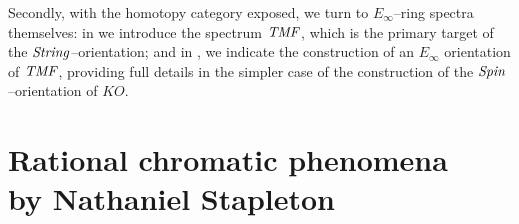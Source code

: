 Secondly, with the homotopy category exposed, we turn to \(E_\infty\)--ring spectra themselves: in  we introduce the spectrum \(\mathit{TMF}\), which is the primary target of the \(\mathit{String}\)--orientation; and in , we indicate the construction of an \(E_\infty\) orientation of \(\mathit{TMF}\), providing full details in the simpler case of the construction of the \(\mathit{Spin}\)--orientation of \(KO\).













\section[Rational chromatic phenomena]{Rational chromatic phenomena \\ by Nathaniel Stapleton}\label{CharacterTheorySection}

